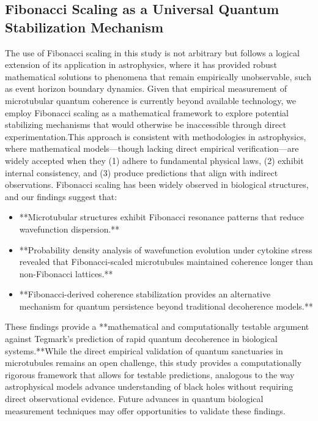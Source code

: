 \subsection{Fibonacci Scaling as a Universal Quantum Stabilization Mechanism}
The use of Fibonacci scaling in this study is not arbitrary but follows a logical extension of its application in astrophysics, where it has provided robust mathematical solutions to phenomena that remain empirically unobservable, such as event horizon boundary dynamics. Given that empirical measurement of microtubular quantum coherence is currently beyond available technology, we employ Fibonacci scaling as a mathematical framework to explore potential stabilizing mechanisms that would otherwise be inaccessible through direct experimentation.This approach is consistent with methodologies in astrophysics, where mathematical models—though lacking direct empirical verification—are widely accepted when they (1) adhere to fundamental physical laws, (2) exhibit internal consistency, and (3) produce predictions that align with indirect observations. 
Fibonacci scaling has been widely observed in biological structures, and our findings suggest that:
\begin{itemize}
\item **Microtubular structures exhibit Fibonacci resonance patterns that reduce wavefunction dispersion.**
\item **Probability density analysis of wavefunction evolution under cytokine stress revealed that Fibonacci-scaled microtubules maintained coherence longer than non-Fibonacci lattices.**
\item **Fibonacci-derived coherence stabilization provides an alternative mechanism for quantum persistence beyond traditional decoherence models.**
\end{itemize}
These findings provide a **mathematical and computationally testable argument against Tegmark’s prediction of rapid quantum decoherence in biological systems.**While the direct empirical validation of quantum sanctuaries in microtubules remains an open challenge, this study provides a computationally rigorous framework that allows for testable predictions, analogous to the way astrophysical models advance understanding of black holes without requiring direct observational evidence. Future advances in quantum biological measurement techniques may offer opportunities to validate these findings.
